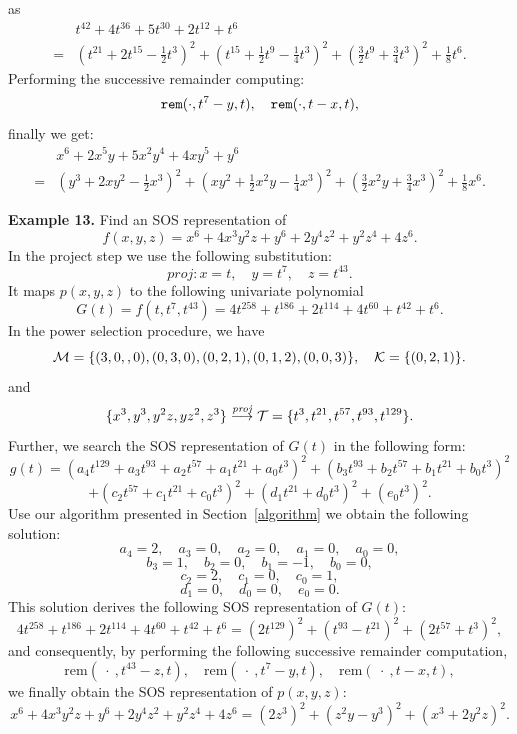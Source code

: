 \documentclass[runningheads]{llncs}
\begin{document}
{as
\begin{align*}
&t^{42}+4t^{36}+5t^{30}+2t^{12}+t^6\\
=&\left(t^{21}+2t^{15}-\frac{1}{2}t^3\right)^2
+\left(t^{15}+\frac{1}{2}t^9-\frac{1}{4}t^3\right)^2
+\left(\frac{3}{2}t^9+\frac{3}{4}t^3\right)^2
+\frac{1}{8}t^6.
\end{align*}
Performing the successive remainder computing:
$$
{\tt rem}(\cdot, t^7-y,t), \quad
{\tt rem}(\cdot, t-x,t),
$$
finally we get:
\begin{align*}
&x^6+2x^5y+5x^2y^4+4xy^5+y^6\\
=&\left(y^{3}+2xy^{2}-\frac{1}{2}x^3\right)^2
+\left(xy^{2}+\frac{1}{2}x^2y-\frac{1}{4}x^3\right)^2
+\left(\frac{3}{2}x^2y+\frac{3}{4}x^3\right)^2
+\frac{1}{8}x^6.
\end{align*}

{\bf Example 13.}
Find an SOS representation of 
\[
f(x, y, z) = x^6 + 4x^3y^2z + y^6 + 2y^4z^2 + y^2z^4 + 4z^6.
\]
In the project step we use the following substitution:
$$
\textit{proj}: x=t, \quad y=t^7, \quad  z=t^{43}.
$$
It maps $p(x,y,z)$ to the following univariate polynomial
\[
G(t) = f(t, t^7, t^{43}) = 4t^{258} + t^{186} + 2t^{114} + 4t^{60} + t^{42} + t^6.
\]
In the power selection procedure, we have
$$
{\cal M}=\{(3,0,,0),(0,3,0),(0,2,1),(0,1,2),(0,0,3)\}, \quad 
{\cal K}=\{(0,2,1)\}.
$$
and
$$
\{x^3, y^3, y^2z, yz^2, z^3\}\stackrel{\textit{proj}}{\longrightarrow} {\cal T}=\{t^3, t^{21}, t^{57}, t^{93}, t^{129}\}.
$$
Further, we search the SOS representation of \( G(t) \) in the following form:
\[
g(t) = \left( a_4 t^{129} + a_3 t^{93} + a_2 t^{57} + a_1 t^{21} + a_0 t^3 \right)^2
+ \left( b_3 t^{93} + b_2 t^{57} + b_1 t^{21} + b_0 t^3 \right)^2
\]
\[
+ \left( c_2 t^{57} + c_1 t^{21} + c_0 t^3 \right)^2
+ \left( d_1 t^{21} + d_0 t^3 \right)^2
+ (e_0 t^3)^2.
\]
Use our algorithm presented in Section~\ref{algorithm} we obtain the following solution:
\[
a_4 = 2, \quad a_3 = 0, \quad a_2 = 0, \quad a_1 = 0, \quad a_0 = 0,
\]
\[
b_3 = 1, \quad b_2 = 0, \quad b_1 = -1, \quad b_0 = 0,
\]
\[
c_2 = 2, \quad c_1 = 0, \quad c_0 = 1,
\]
\[
d_1 = 0, \quad d_0 = 0, \quad e_0 = 0.
\]
This solution derives the following SOS representation of \( G(t) \):
\[
4 t^{258} + t^{186} + 2 t^{114} + 4 t^{60} + t^{42} + t^6 = (2 t^{129})^2 + (t^{93} - t^{21})^2 + (2 t^{57} + t^3)^2,
\]
and consequently, by performing the following successive remainder computation,  
\[
\text{rem}({ ~\cdot~}, t^{43} - z, t), \quad \text{rem}(~\cdot~, t^{7} - y, t), \quad \text{rem}(~\cdot~, t - x, t),
\]
we finally obtain the SOS representation of \( p(x,y,z) \):
\[
x^6 + 4 x^3 y^2 z + y^6 + 2 y^4 z^2 + y^2 z^4 + 4 z^6 = (2 z^3)^2 + (z^2 y - y^3)^2 + (x^3 + 2 y^2 z)^2.
\]

}
\end{document}
